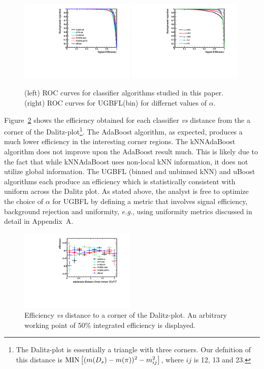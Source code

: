 \begin{figure}[] 
  \centering 
  \includegraphics[width=0.49\textwidth]{ROC_DP.pdf}
  \includegraphics[width=0.49\textwidth]{ROC_DP_Alpha.pdf}
  \caption{\label{fig:dalitz_rocs} (left) ROC curves for classifier algorithms studied in this paper.  (right) ROC curves for UGBFL(bin) for differnet values of $\alpha$.}
\end{figure}

Figure~\ref{fig:dalitz_results} shows the efficiency obtained for each classifier {\em vs} distance from the a corner of the Dalitz-plot\footnote{The Dalitz-plot is essentially a triangle with three corners. Our defnition of this distance is ${\rm MIN}\left[(m(D_s)-m(\pi))^2 - m_{ij}^2\right]$, where $ij$ is 12, 13 and 23.}.  The AdaBoost algorithm, as expected, produces a much lower efficiency in the interesting corner regions.  The kNNAdaBoost algorithm does not improve upon the AdaBoost result much.  This is likely due to the fact that while kNNAdaBoost uses non-local kNN information, it does not utilize global information.
The UGBFL (binned and unbinned kNN) and uBoost algorithms each produce an efficiency which is statistically consistent with uniform across the Dalitz plot.  
As stated above, the analyst is free to optimize the choice of $\alpha$ for UGBFL by defining a metric that involves signal efficiency, background rejection and uniformity, {\em e.g.}, using uniformity metrics discussed in detail in Appendix~A.  

\begin{figure}[] 
  \centering 
  \includegraphics[width=0.49\textwidth]{DP_compare.pdf}
  \caption{\label{fig:dalitz_results} Efficiency {\em vs} distance to a corner of the Dalitz-plot.  An arbitrary working point of 50\% integrated efficiency is displayed.}
\end{figure}



